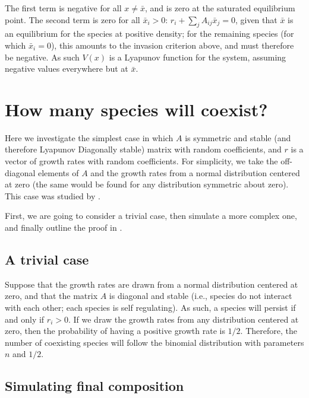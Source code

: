 \documentclass[
]{book}
\begin{document}
The first term is negative for all \(x \neq \bar{x}\), and is zero at the saturated equilibrium point. The second term is zero for all \(\bar{x}_i > 0\): \(r_i + \sum_j A_{ij} \bar{x}_j = 0\), given that \(\bar{x}\) is an equilibrium for the species at positive density; for the remaining species (for which \(\bar{x}_i = 0\)), this amounts to the invasion criterion above, and must therefore be negative. As such \(V(x)\) is a Lyapunov function for the system, assuming negative values everywhere but at \(\bar{x}\).

\hypertarget{how-many-species-will-coexist}{%
\section{How many species will coexist?}\label{how-many-species-will-coexist}}

Here we investigate the simplest case in which \(A\) is symmetric and stable (and therefore Lyapunov Diagonally stable) matrix with random coefficients, and \(r\) is a vector of growth rates with random coefficients. For simplicity, we take the off-diagonal elements of \(A\) and the growth rates from a normal distribution centered at zero (the same would be found for any distribution symmetric about zero). This case was studied by \citet{servan2018coexistence}.

First, we are going to consider a trivial case, then simulate a more complex one, and finally outline the proof in \citet{servan2018coexistence}.

\hypertarget{a-trivial-case}{%
\subsection{A trivial case}\label{a-trivial-case}}

Suppose that the growth rates are drawn from a normal distribution centered at zero, and that the matrix \(A\) is diagonal and stable (i.e., species do not interact with each other; each species is self regulating). As such, a species will persist if and only if \(r_i > 0\). If we draw the growth rates from any distribution centered at zero, then the probability of having a positive growth rate is \(1/2\). Therefore, the number of coexisting species will follow the binomial distribution with parameters \(n\) and \(1/2\).

\hypertarget{simulating-final-composition}{%
\subsection{Simulating final composition}\label{simulating-final-composition}}
\end{document}

